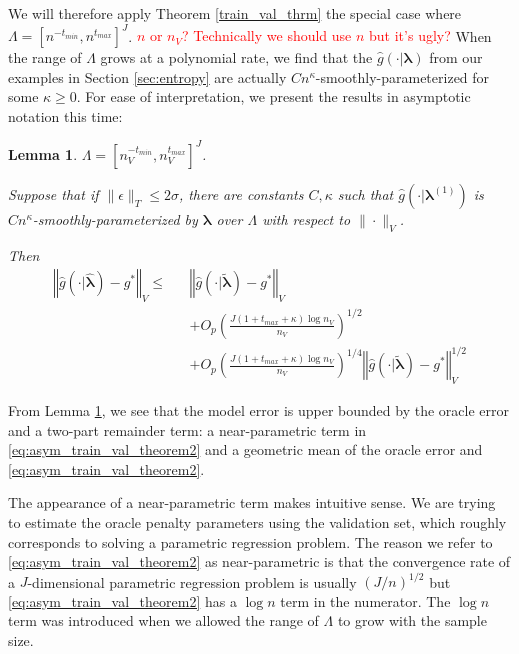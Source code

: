 \documentclass[12pt]{article}
\newtheorem{lemma}{Lemma}
\begin{document}
We will therefore apply Theorem \ref{train_val_thrm} the special case where $\Lambda = [n^{-t_{min}},n^{t_{max}}]^{J}$. 
\textcolor{red}{$n$ or $n_V$? Technically we should use $n$ but it's ugly?}
When the range of $\Lambda$ grows at a polynomial rate, we find that the $\hat g(\cdot | \boldsymbol{\lambda})$ from our examples in Section \ref{sec:entropy} are actually $Cn^\kappa$-smoothly-parameterized for some $\kappa \ge 0$. For ease of interpretation, we present the results in asymptotic notation this time:

\begin{lemma}
	\label{lemma:train_val_special}
	$\Lambda=[n_{V}^{-t_{min}},n_{V}^{t_{max}}]^{J}$.
	
	Suppose that if $\|\epsilon\|_{T}\le2\sigma$, there are constants
	$C,\kappa$ such that $\hat{g}(\cdot|\boldsymbol{\lambda}^{(1)})$ is $Cn^\kappa$-smoothly-parameterized by $\boldsymbol{\lambda}$ over $\Lambda$ with respect to $\|\cdot \|_V$.
	
	Then
	\begin{eqnarray}
	\left\Vert \hat{g}(\cdot|\hat{\boldsymbol{\lambda}})-g^{*}\right\Vert _{V}\le 
	&& \left\Vert \hat{g}(\cdot|\tilde{\boldsymbol{\lambda}})-g^{*}\right\Vert _{V} \label{eq:asym_train_val_theorem1} \\
	&& + O_p \left(\frac{J\left(1+t_{max}+\kappa\right)\log n_{V}}{n_{V}}\right)^{1/2} \label{eq:asym_train_val_theorem2} \\
	&& + O_p \left(\frac{J\left(1+t_{max}+\kappa\right)\log n_{V}}{n_{V}}\right)^{1/4} \left\Vert \hat{g}(\cdot|\tilde{\boldsymbol{\lambda}})-g^{*}\right\Vert _{V}^{1/2} \label{eq:asym_train_val_theorem3}
	\end{eqnarray}
\end{lemma}

From Lemma \ref{lemma:train_val_special}, we see that the model error is upper bounded by the oracle error and a two-part remainder term: a near-parametric term in \ref{eq:asym_train_val_theorem2} and a geometric mean of the oracle error and \ref{eq:asym_train_val_theorem2}.

The appearance of a near-parametric term makes intuitive sense. We are trying to estimate the oracle penalty parameters using the validation set, which roughly corresponds to solving a parametric regression problem. The reason we refer to \ref{eq:asym_train_val_theorem2} as near-parametric is that the convergence rate of a $J$-dimensional parametric regression problem is usually $(J/n)^{1/2}$ but \ref{eq:asym_train_val_theorem2} has a $\log n$ term in the numerator. The $\log n$ term was introduced when we allowed the range of $\Lambda$ to grow with the sample size.
\end{document}
